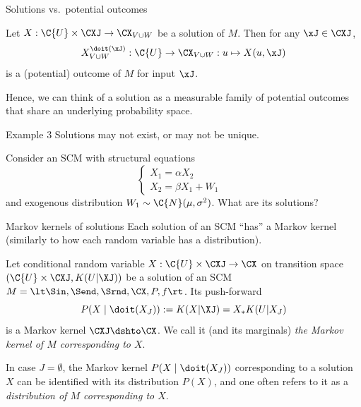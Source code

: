 \begin{frame}{Solutions vs.\ potential outcomes}
\begin{Rem}[\ref{def:scm_potential_outcome}]
  Let $X : \C{U} \times \CXJ \to \CX_{V\cup W}$ be a solution of $M$. 
  Then for any $\xJ \in \CXJ$, 
  $$X^{\doit(\xJ)}_{V\cup W} : \C{U} \to \CX_{V\cup W} : u \mapsto X(u,\xJ)$$ 
  is a (potential) outcome of $M$ for input $\xJ$.
\end{Rem}
Hence, we can think of a solution as a measurable family of potential outcomes that share an underlying probability space.
\end{frame}

\begin{frame}[t]{Example 3}
Solutions may not exist, or may not be unique.
\begin{Eg}
Consider an SCM with structural equations
$$\begin{cases}
  X_1 = \alpha X_2 & \\
  X_2 = \beta X_1 + W_1 &
\end{cases}$$
and exogenous distribution $W_1 \sim \C{N}(\mu,\sigma^2)$. What are its solutions?

\bigskip
{}
\end{Eg}
\end{frame}

\begin{frame}{Markov kernels of solutions}
Each solution of an SCM ``has'' a Markov kernel (similarly to how each random variable has a distribution).
\begin{Not}[\ref{def:scm_kernels}]
  Let conditional random variable $X : \C{U} \times \CXJ \to \CX$ on transition space $(\C{U} \times \CXJ, K(U|\XJ))$ be a solution of an SCM
  $M = \lt \Sin, \Send, \Srnd, \CX, P, f \rt$.
  Its push-forward 
  $$P(X \mid \doit(X_J)) := K(X|\XJ) = X_* K(U|X_J)$$
  is a Markov kernel $\CXJ \dshto \CX$.
  We call it (and its marginals) \emph{the Markov kernel of $M$ corresponding to $X$}.
\end{Not}

\begin{Rem}
In case $J = \emptyset$, the Markov kernel $P(X \mid \doit(X_J))$ corresponding to a solution $X$ can be identified with its distribution $P(X)$, and one often refers to it as a \emph{distribution of $M$ corresponding to $X$}.
\end{Rem}
\end{frame}

